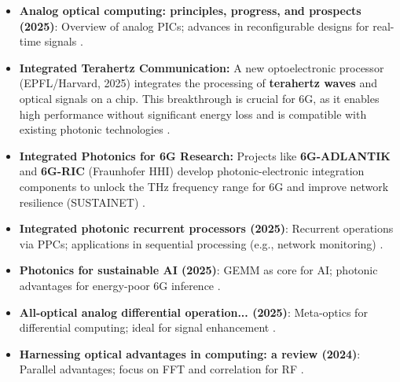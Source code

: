 	\begin{itemize}
		\item \textbf{Analog optical computing: principles, progress, and prospects (2025)}: Overview of analog PICs; advances in reconfigurable designs for real-time signals \cite{analog_optical}.
		\item \textbf{Integrated Terahertz Communication:} A new optoelectronic processor (EPFL/Harvard, 2025) integrates the processing of \textbf{terahertz waves} and optical signals on a chip. This breakthrough is crucial for 6G, as it enables high performance without significant energy loss and is compatible with existing photonic technologies \cite{thz_epfl}.
		\item \textbf{Integrated Photonics for 6G Research:} Projects like \textbf{6G-ADLANTIK} and \textbf{6G-RIC} (Fraunhofer HHI) develop photonic-electronic integration components to unlock the THz frequency range for 6G and improve network resilience (SUSTAINET) \cite{hhi_6g}.
		\item \textbf{Integrated photonic recurrent processors (2025)}: Recurrent operations via PPCs; applications in sequential processing (e.g., network monitoring) \cite{recurrent_photonics}.
		\item \textbf{Photonics for sustainable AI (2025)}: GEMM as core for AI; photonic advantages for energy-poor 6G inference \cite{photonics_ai}.
		\item \textbf{All-optical analog differential operation... (2025)}: Meta-optics for differential computing; ideal for signal enhancement \cite{differential_optical}.
		\item \textbf{Harnessing optical advantages in computing: a review (2024)}: Parallel advantages; focus on FFT and correlation for RF \cite{optical_advantages}.
	\end{itemize}
	
